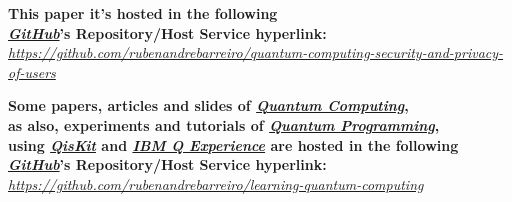 \documentclass[conference]{IEEEtran}
\begin{document}
\vspace{4pt}

\begin{center}
    \small{
        \textbf{
            This paper it's hosted in the following \\ \href{https://github.com/}{\textit{GitHub}}'s Repository/Host Service hyperlink:
        }\\
        \vspace{3pt}
        \href{https://github.com/rubenandrebarreiro/quantum-computing-security-and-privacy-of-users}{\textit{https://github.com/rubenandrebarreiro/quantum-computing-security-and-privacy-of-users}}
    }
\end{center}

\begin{center}
    \small{
        \textbf{
            Some papers, articles and slides of \href{https://en.wikipedia.org/wiki/Quantum_computing}{\textit{Quantum Computing}},\\ as also, experiments and tutorials of \href{https://en.wikipedia.org/wiki/Quantum_programming}{\textit{Quantum Programming}},\\ using \href{https://qiskit.org/}{\textit{QisKit}} and \href{https://quantum-computing.ibm.com/}{\textit{IBM Q Experience}} are hosted in the following \\ \href{https://github.com/}{\textit{GitHub}}'s Repository/Host Service hyperlink:
        }\\
        \vspace{3pt}
        \href{https://github.com/rubenandrebarreiro/learning-quantum-computing}{\textit{https://github.com/rubenandrebarreiro/learning-quantum-computing}}
    }
\end{center}
\end{document}
